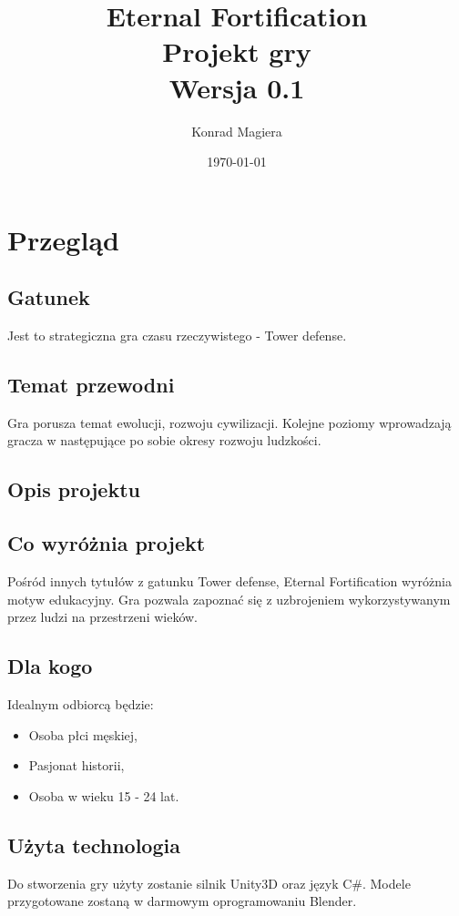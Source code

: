 \documentclass[a4paper,12pt, twoside, titlepage]{article}
\title{\Huge{\textbf{Eternal Fortification}}\\ \Large{Projekt gry}\\ \large{Wersja 0.1}}
\author{Konrad Magiera}
\date{\today}
\begin{document}
\maketitle
\newpage
{}
\tableofcontents
\newpage


\section{Przegląd}
\subsection{Gatunek}
Jest to strategiczna gra czasu rzeczywistego - Tower defense.

\subsection{Temat przewodni}
Gra porusza temat ewolucji, rozwoju cywilizacji. Kolejne poziomy wprowadzają gracza w następujące po sobie okresy rozwoju ludzkości.

\subsection{Opis projektu}


\subsection{Co wyróżnia projekt}
Pośród innych tytułów z gatunku Tower defense, Eternal Fortification wyróżnia motyw edukacyjny. Gra pozwala zapoznać się z uzbrojeniem wykorzystywanym przez ludzi na przestrzeni wieków.

\subsection{Dla kogo}
Idealnym odbiorcą będzie:
\begin{itemize}
	\item Osoba płci męskiej,
	\item Pasjonat historii,
	\item Osoba w wieku 15 - 24 lat.
\end{itemize}

\subsection{Użyta technologia}
Do stworzenia gry użyty zostanie silnik Unity3D oraz język C\#. Modele przygotowane zostaną w darmowym oprogramowaniu Blender.
\end{document}

